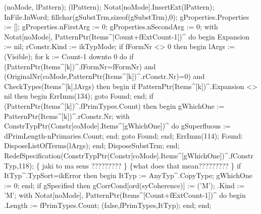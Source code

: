    (noMode, lPattern);
   (lPattern);
   Notat[noMode].InsertExt(lPattern);
   InFile.InWord;
   fillchar(gSubstTrm,sizeof(gSubstTrm),0);
   gProperties.Properties := [];
   gProperties.nFirstArg := 0;
   gProperties.nSecondArg := 0;
   with Notat[noMode], PatternPtr(Items^[Count+fExtCount-1])^ do
   begin
      Expansion := nil;
      rConstr.Kind := ikTypMode;
      if fFormNr <> 0 then
      begin
         lArgs := (Visible);
         for k := Count-1 downto 0 do
            if (PatternPtr(Items^[k])^.fFormNr=fFormNr) and
                  (OriginalNr(coMode,PatternPtr(Items^[k])^.rConstr.Nr)=0) and
                  CheckTypes(Items^[k],lArgs) then
            begin
               if PatternPtr(Items^[k])^.Expansion <> nil then
               begin
                  ErrImm(134);
                  goto Found;
               end;
               if (PatternPtr(Items^[k])^.fPrimTypes.Count) then
               begin
                  gWhichOne := PatternPtr(Items^[k])^.rConstr.Nr;
                  with ConstrTypPtr(Constr[coMode].Items^[gWhichOne])^ do
                     gSuperfluous := dPrimLength-nPrimaries.Count;
               end;
               goto Found;
            end;
         ErrImm(114);
         Found:
            DisposeListOfTerms(lArgs);
      end;
      DisposeSubstTrm;
   end;
   RedefSpecification(ConstrTypPtr(Constr[coMode].Items^[gWhichOne])^.fConstrTyp,118);
   \{ jaki to ma sens ????????? \} \{what does that mean????????? \}
   if ItTyp^.TypSort=ikError then
   begin
      ItTyp := AnyTyp^.CopyType;
      gWhichOne := 0;
   end;
   if gSpecified then gCorrCond[ord(syCoherence)] := ('M');
   .Kind := 'M';
   with Notat[noMode], PatternPtr(Items^[Count+fExtCount-1])^ do
   begin
      .Length := fPrimTypes.Count;
      (false,fPrimTypes,ItTyp);
   end;
end;
\eatline
